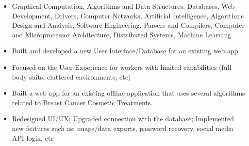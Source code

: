 \documentclass[10pt,a4paper]{altacv}
\begin{document}

\begin{fullwidth}
\makecvheader
\end{fullwidth}

\begin{itemize}
    \item Graphical Computation, Algorithms and Data Structures, Databases, Web Development, Drivers, Computer Networks, Artificial Intelligence, Algorithms Design and Analysis, Software Engineering, Parsers and Compilers, Computer and Microprocessor Architecture, Distributed Systems, Machine Learning
\end{itemize}


\begin{itemize}
\item Built and developed a new User Interface/Database for an existing web app
\item Focused on the User Experience for workers with limited capabilities (full body suits, cluttered environments, etc)
\end{itemize}

\vspace{2mm}

\begin{itemize}
\item Built a web app for an existing offline application that uses several algorithms related to Breast Cancer Cosmetic Treatments.
\item Redesigned UI/UX; Upgraded connection with the database; Implemented new features such as: image/data exports, password recovery, social media API login, etc

\end{itemize}

\end{document}
